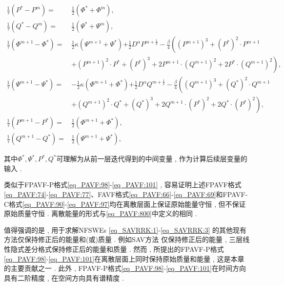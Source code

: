 \begin{enumerate}[$\bullet$]
\begin{align}
\frac{1}{\tau}\left(P^{*}-P^{m}\right)=&\frac{1}{2}(\varPhi^{*}+\varPhi^{m}) , \label{eq_PAVF:92}\\
\frac{1}{\tau}\left(Q^{*}-Q^{m}\right)=&\frac{1}{2}(\Psi^{*}+\Psi^{m}) , \label{eq_PAVF:93}\\
\frac{1}{\tau}\left(\varPhi^{m+1}-\varPhi^{*}\right)=&\frac{1}{2}\kappa (\Psi^{m+1}+\Psi^{*}){+\frac{1}{2}D^{\alpha} P^{m+\frac{1}{2}}}-\frac{\beta}{4}\left((P^{m+1})^3+(P^{*})^{2}\cdot P^{m+1}\right . \nonumber\\
		&\left . +(P^{m+1})^{2}\cdot P^{*}+ (P^{*})^{3}+2 P^{m+1}\cdot (Q^{m+1})^{2}+2 P^{*}\cdot (Q^{m+1})^{2}\right) , \label{eq_PAVF:94}\\
\frac{1}{\tau}\left(\Psi^{m+1}-\Psi^{*}\right)=&-\frac{1}{2}\kappa (\varPhi^{m+1}+\varPhi^{*}){+\frac{1}{2}D^{\alpha} Q^{m+\frac{1}{2}}}-\frac{\beta}{4}\left((Q^{m+1})^3+(Q^{*})^{2}\cdot Q^{m+1}\right . \nonumber\\
		&\left . +(Q^{m+1})^{2}\cdot Q^{*}+ (Q^{*})^{3}+2 Q^{m+1}\cdot (P^{*})^{2}+2 Q^{*}\cdot (P^{*})^{2}\right) , \label{eq_PAVF:95}\\
\frac{1}{\tau}\left(P^{m+1}-P^{*}\right)=&\frac{1}{2}(\varPhi^{m+1}+\varPhi^{*}) , \label{eq_PAVF:96}\\
\frac{1}{\tau}\left(Q^{m+1}-Q^{*}\right)=&\frac{1}{2}(\Psi^{m+1}+\Psi^{*}) , \label{eq_PAVF:97}
\end{align}
\end{enumerate}
其中$\Phi^* , \Psi^* , P^* , Q^*$可理解为从前一层迭代得到的中间变量 , 作为计算后续层变量的输入 . 

\begin{remark}\label{rk_PAVF:1}
类似于FPAVF-P格式\eqref{eq_PAVF:98}-\eqref{eq_PAVF:101} , 容易证明上述FPAVF格式\eqref{eq_PAVF:74}-\eqref{eq_PAVF:77}、FAVF格式\eqref{eq_PAVF:66}-\eqref{eq_PAVF:69}和FPAVF-C格式\eqref{eq_PAVF:90}-\eqref{eq_PAVF:97}均在离散层面上保证原始能量守恒 , 但不保证原始质量守恒 . 离散能量的形式与\eqref{eq_PAVF:800}中定义的相同 . 
\end{remark}

\begin{remark}\label{rk_PAVF:2}
值得强调的是 , 用于求解NFSWEs \eqref{eq_SAVRRK:1}-\eqref{eq_SAVRRK:3} 的其他现有方法仅保持修正后的能量和(或)质量 . 
例如SAV方法 \cite{chengConvergenceEnergyconservingScheme2022}仅保持修正后的能量 , 
三层线性隐式差分格式\cite{ranLinearlyImplicitConservative2016}保持修正后的能量和质量 . 
然而 , 所提出的FPAVF-P格式\eqref{eq_PAVF:98}-\eqref{eq_PAVF:101}在离散层面上同时保持原始质量和能量 , 这是本章的主要贡献之一 . 
此外 , FPAVF-P格式\eqref{eq_PAVF:98}-\eqref{eq_PAVF:101}在时间方向具有二阶精度 , 在空间方向具有谱精度 . 
\end{remark}

